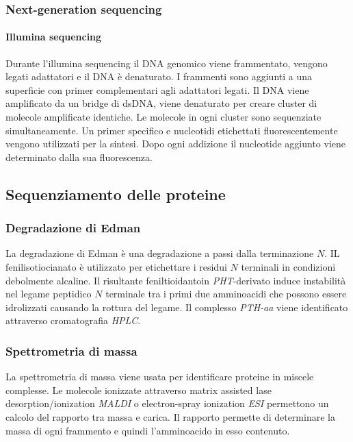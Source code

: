 		\subsubsection{Next-generation sequencing}

			\paragraph{Illumina sequencing}
			Durante l'illumina sequencing il DNA genomico viene frammentato, vengono legati adattatori e il DNA \`e denaturato.
			I frammenti sono aggiunti a una superficie con primer complementari agli adattatori legati.
			Il DNA viene amplificato da un bridge di dsDNA, viene denaturato per creare cluster di molecole amplificate identiche.
			Le molecole in ogni cluster sono sequenziate simultaneamente.
			Un primer specifico e nucleotidi etichettati fluorescentemente vengono utilizzati per la sintesi.
			Dopo ogni addizione il nucleotide aggiunto viene determinato dalla sua fluorescenza.
	
	\subsection{Sequenziamento delle proteine}

		\subsubsection{Degradazione di Edman}
		La degradazione di Edman \`e una degradazione a passi dalla terminazione $N$.
		IL fenilisotiocianato \`e utilizzato per etichettare i residui $N$ terminali in condizioni debolmente alcaline.
		Il risultante feniltioidantoin \emph{PHT}-derivato induce instabilit\`a nel legame peptidico $N$ terminale tra i primi due amminoacidi che possono essere idrolizzati causando la rottura del legame.
		Il complesso \emph{PTH-aa} viene identificato attraverso cromatografia \emph{HPLC}.

		\subsubsection{Spettrometria di massa}
		La spettrometria di massa viene usata per identificare proteine in miscele complesse.
		Le molecole ionizzate attraverso matrix assisted lase desorption/ionization \emph{MALDI} o electron-spray ionization \emph{ESI} permettono un calcolo del rapporto tra massa e carica.
		Il rapporto permette di determinare la massa di ogni frammento e quindi l'amminoacido in esso contenuto.

